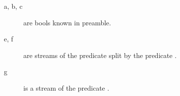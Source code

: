 
\begin{description}
  \item[a, b, c] are bools known in preamble.
  \item[e, f] are streams of the predicate  split by the predicate .
  \item[g] is a stream of the predicate .
\end{description}



